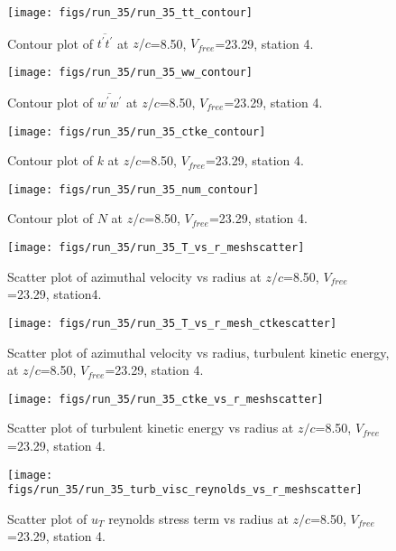 \begin{figure}[H]
\centering
\texttt{[image: figs/run\_35/run\_35\_tt\_contour]}
\caption{Contour plot of $\overline{t^\prime t^\prime}$ at $z/c$=8.50, $V_{free}$=23.29, station 4.}
\end{figure}


\begin{figure}[H]
\centering
\texttt{[image: figs/run\_35/run\_35\_ww\_contour]}
\caption{Contour plot of $\overline{w^\prime w^\prime}$ at $z/c$=8.50, $V_{free}$=23.29, station 4.}
\end{figure}


\begin{figure}[H]
\centering
\texttt{[image: figs/run\_35/run\_35\_ctke\_contour]}
\caption{Contour plot of $k$ at $z/c$=8.50, $V_{free}$=23.29, station 4.}
\end{figure}


\begin{figure}[H]
\centering
\texttt{[image: figs/run\_35/run\_35\_num\_contour]}
\caption{Contour plot of $N$ at $z/c$=8.50, $V_{free}$=23.29, station 4.}
\end{figure}


\begin{figure}[H]
\centering
\texttt{[image: figs/run\_35/run\_35\_T\_vs\_r\_meshscatter]}
\caption{Scatter plot of azimuthal velocity vs radius at $z/c$=8.50, $V_{free}$=23.29, station4.}
\end{figure}


\begin{figure}[H]
\centering
\texttt{[image: figs/run\_35/run\_35\_T\_vs\_r\_mesh\_ctkescatter]}
\caption{Scatter plot of azimuthal velocity vs radius, turbulent kinetic energy, at $z/c$=8.50, $V_{free}$=23.29, station 4.}
\end{figure}


\begin{figure}[H]
\centering
\texttt{[image: figs/run\_35/run\_35\_ctke\_vs\_r\_meshscatter]}
\caption{Scatter plot of turbulent kinetic energy vs radius at $z/c$=8.50, $V_{free}$=23.29, station 4.}
\end{figure}


\begin{figure}[H]
\centering
\texttt{[image: figs/run\_35/run\_35\_turb\_visc\_reynolds\_vs\_r\_meshscatter]}
\caption{Scatter plot of $
u_T$ reynolds stress term vs radius at $z/c$=8.50, $V_{free}$=23.29, station 4.}
\end{figure}


